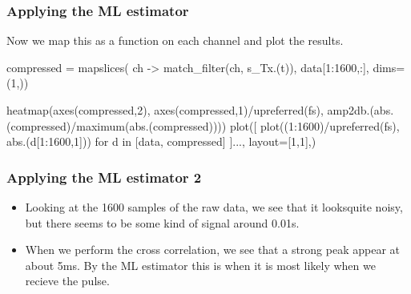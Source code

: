 \documentclass[compress]{beamer}
\begin{document}
\begin{frame}[fragile] %
    \frametitle{Applying the ML estimator}
    Now we map this as a function on each channel and plot the results.
    \begin{jllisting}[gobble=8]
        compressed = mapslices(
            ch -> match_filter(ch, s_Tx.(t)),
            data[1:1600,:], dims=(1,)) 

        heatmap(axes(compressed,2), axes(compressed,1)/upreferred(fs), 
            amp2db.(abs.(compressed)/maximum(abs.(compressed))))
        plot([
            plot((1:1600)/upreferred(fs), abs.(d[1:1600,1]))
            for d in [data, compressed]
        ]..., layout=[1,1],)
    \end{jllisting}
    \begin{figure}
        \centering
        \begin{subfigure}{0.5\textwidth}
            \centering
            
        \end{subfigure}%
        \begin{subfigure}{0.5\textwidth}
            \centering
            
        \end{subfigure}
    \end{figure}
\end{frame}

\begin{frame} %
    \frametitle{Applying the ML estimator 2}
    \begin{itemize}
        \item Looking at the 1600 samples of the raw data, we see that it looksquite noisy,
            but there seems to be some kind of signal around 0.01s. 

        \item When we perform the cross correlation, we see that a strong peak appear at
            about 5ms. By the ML estimator this is when it is most likely when we
            recieve the pulse.
    \end{itemize}
\end{frame} %
\end{document}
